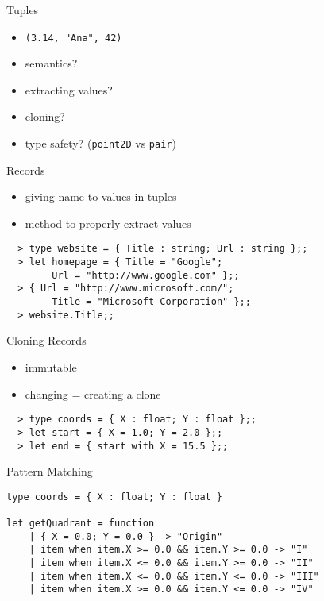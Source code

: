 \documentclass{beamer}
\begin{document}
\begin{frame}[label=tuples]{Tuples}
  \begin{itemize}
    \item \texttt{(3.14, "Ana", 42)}
    \item semantics?
    \item extracting values?
    \item cloning?
    \item type safety? (\texttt{point2D} vs \texttt{pair})
  \end{itemize}
\end{frame}

\begin{frame}[fragile]{Records}
  \begin{itemize}
    \item giving name to values in tuples
    \item method to properly extract values
  \end{itemize}
  \begin{verbatim}
  > type website = { Title : string; Url : string };;
  > let homepage = { Title = "Google";
        Url = "http://www.google.com" };;
  > { Url = "http://www.microsoft.com/";
        Title = "Microsoft Corporation" };;
  > website.Title;;
  \end{verbatim}
\end{frame}

\begin{frame}[fragile]{Cloning Records}
  \begin{itemize}
    \item immutable
    \item changing = creating a clone
  \end{itemize}
  \begin{verbatim}
  > type coords = { X : float; Y : float };;
  > let start = { X = 1.0; Y = 2.0 };;
  > let end = { start with X = 15.5 };;
  \end{verbatim}
\end{frame}

\begin{frame}[fragile]{Pattern Matching}
  \begin{verbatim}
type coords = { X : float; Y : float }
 
let getQuadrant = function
    | { X = 0.0; Y = 0.0 } -> "Origin"
    | item when item.X >= 0.0 && item.Y >= 0.0 -> "I"
    | item when item.X <= 0.0 && item.Y >= 0.0 -> "II"
    | item when item.X <= 0.0 && item.Y <= 0.0 -> "III"
    | item when item.X >= 0.0 && item.Y <= 0.0 -> "IV"
  \end{verbatim}
\end{frame}
\end{document}
